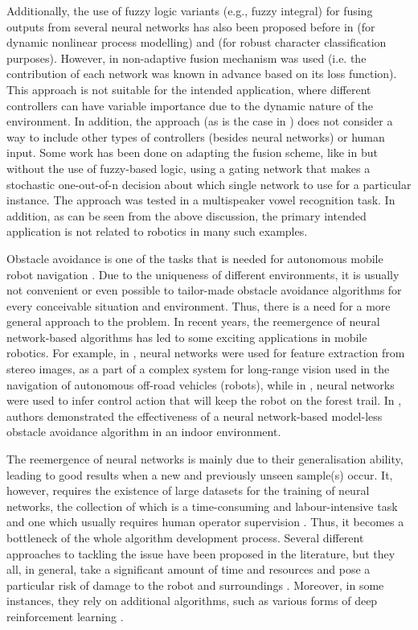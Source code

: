 Additionally, the use of fuzzy logic variants (e.g., fuzzy integral) for fusing outputs from several neural networks has also been proposed before in \cite{Cho1995} (for dynamic nonlinear process modelling) and \cite{Ahmad2005} (for robust character classification purposes). However, in \cite{Ahmad2005} non-adaptive fusion mechanism was used (i.e. the contribution of each network was known in advance based on its loss function). This approach is not suitable for the intended application, where different controllers can have variable importance due to the dynamic nature of the environment. In addition, the approach (as is the case in \cite{Cho1995}) does not consider a way to include other types of controllers (besides neural networks) or human input. Some work has been done on adapting the fusion scheme, like in \cite{Jacobs1991} but without the use of fuzzy-based logic, using a gating network that makes a stochastic one-out-of-n decision about which single network to use for a particular instance. The approach was tested in a multispeaker vowel recognition task. In addition, as can be seen from the above discussion, the primary intended application is not related to robotics in many such examples.

Obstacle avoidance is one of the tasks that is needed for autonomous mobile robot navigation \cite{Sullivan2017}. Due to the uniqueness of different environments, it is usually not convenient or even possible to tailor-made obstacle avoidance algorithms for every conceivable situation and environment. Thus, there is a need for a more general approach to the problem. In recent years, the reemergence of neural network-based algorithms has led to some exciting applications in mobile robotics. For example, in \cite{Hadsell2009}, neural networks were used for feature extraction from stereo images, as a part of a complex system for long-range vision used in the navigation of autonomous off-road vehicles (robots), while in \cite{Giusti2016}, neural networks were used to infer control action that will keep the robot on the forest trail. In \cite{Tai2016}, authors demonstrated the effectiveness of a neural network-based model-less obstacle avoidance algorithm in an indoor environment. 

The reemergence of neural networks is mainly due to their generalisation ability, leading to good results when a new and previously unseen sample(s) occur. It, however, requires the existence of large datasets for the training of neural networks, the collection of which is a time-consuming and labour-intensive task and one which usually requires human operator supervision \cite{Giusti2016,Gandhi2017,Pinto2016}. Thus, it becomes a bottleneck of the whole algorithm development process. Several different approaches to tackling the issue have been proposed in the literature, but they all, in general, take a significant amount of time and resources and pose a particular risk of damage to the robot and surroundings \cite{Gandhi2017,Pinto2016}. Moreover, in some instances, they rely on additional algorithms, such as various forms of deep reinforcement learning \cite{Mnih2015,Xie2017}. 

